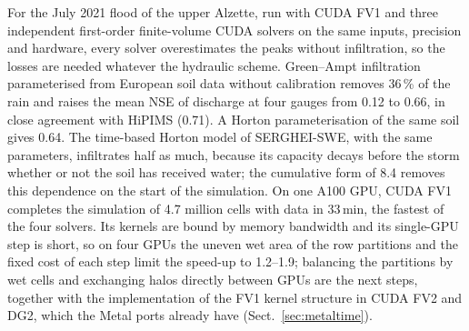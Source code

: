 \documentclass[preprint,12pt,authoryear]{elsarticle}
\begin{document}
For the July 2021 flood of the upper Alzette, run with CUDA FV1 and three
independent first-order finite-volume CUDA solvers on the same inputs,
precision and hardware, every solver overestimates the peaks without
infiltration, so the losses are needed whatever the
hydraulic scheme. Green--Ampt infiltration parameterised from European soil
data without calibration removes 36\,\% of the rain and raises the mean NSE
of discharge at four gauges from 0.12 to 0.66, in close agreement with HiPIMS
(0.71). A Horton parameterisation of the same soil gives 0.64. The time-based
Horton model of SERGHEI-SWE, with the same parameters, infiltrates half as
much, because its capacity decays before the storm whether or not the soil
has received water; the cumulative form of 8.4 removes this dependence on the
start of the simulation. On one A100 GPU, CUDA FV1 completes the
simulation of 4.7 million cells with data in 33\,min, the fastest of the
four solvers.
Its kernels are bound by memory bandwidth and its single-GPU step is short,
so on four GPUs the uneven wet area of the row partitions and the fixed cost
of each step limit the speed-up to 1.2--1.9; balancing the partitions by wet
cells and exchanging halos directly between GPUs are the next steps, together
with the implementation of the FV1 kernel structure in CUDA FV2 and DG2,
which the Metal ports already have (Sect.~\ref{sec:metaltime}).
\end{document}
